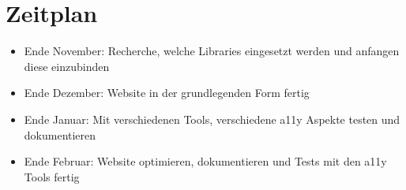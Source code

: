 \chapter{Zeitplan}

\label{Chapter2}

\begin{itemize}
    \item Ende November: Recherche, welche Libraries eingesetzt werden und anfangen diese einzubinden
    \item Ende Dezember: Website in der grundlegenden Form fertig
    \item Ende Januar: Mit verschiedenen Tools, verschiedene a11y Aspekte testen und dokumentieren
    \item Ende Februar: Website optimieren, dokumentieren und Tests mit den a11y Tools fertig
\end{itemize}